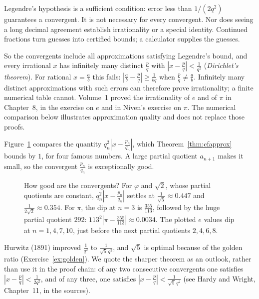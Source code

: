 \begin{reminder}
Legendre's hypothesis is a sufficient condition: error less than $1/(2q^2)$ guarantees a convergent. It is not necessary for every convergent. Nor does seeing a long decimal agreement establish irrationality or a special identity. Continued fractions turn guesses into certified bounds; a calculator supplies the guesses.
\end{reminder}

So the convergents include all approximations satisfying Legendre's bound, and every irrational $x$ has infinitely many distinct $\frac pq$ with $\left|x-\frac pq\right|<\frac1{q^2}$ (\emph{Dirichlet's theorem}). For rational $x=\frac ab$ this fails: $\left|\frac ab-\frac pq\right|\ge\frac1{bq}$ when $\frac pq\ne\frac ab$. Infinitely many distinct approximations with such errors can therefore prove irrationality; a finite numerical table cannot. Volume~1 proved the irrationality of $e$ and of $\pi$ in Chapter~8, in the exercise on $e$ and in Niven's exercise on $\pi$. The numerical comparison below illustrates approximation quality and does not replace those proofs.

Figure~\ref{fig:quality} compares the quantity $q_n^2\left|x-\frac{p_n}{q_n}\right|$, which Theorem~\ref{thm:cfapprox} bounds by $1$, for four famous numbers. A large partial quotient $a_{n+1}$ makes it small, so the convergent $\frac{p_n}{q_n}$ is exceptionally good.

\begin{figure}[ht]
\centering
{}
\caption{How good are the convergents? For $\varphi$ and $\sqrt2$, whose partial quotients are constant, $q_n^2\left|x-\frac{p_n}{q_n}\right|$ settles at $\frac1{\sqrt5}\approx0.447$ and $\frac1{2\sqrt2}\approx0.354$. For $\pi$, the dip at $n=3$ is $\frac{355}{113}$, followed by the huge partial quotient $292$: $113^2\left|\pi-\frac{355}{113}\right|\approx0.0034$. The plotted $e$ values dip at $n=1,4,7,10$, just before the next partial quotients $2,4,6,8$.}
\label{fig:quality}
\end{figure}

\begin{remark}
Hurwitz (1891) improved $\frac1{q^2}$ to $\frac1{\sqrt5\,q^2}$, and $\sqrt5$ is optimal because of the golden ratio (Exercise~\ref{ex:golden}). We quote the sharper theorem as an outlook, rather than use it in the proof chain: of any two consecutive convergents one satisfies $|x-\frac pq|<\frac1{2q^2}$, and of any three, one satisfies $|x-\frac pq|<\frac1{\sqrt5\,q^2}$ (see Hardy and Wright, Chapter~11, in the sources).
\end{remark}

